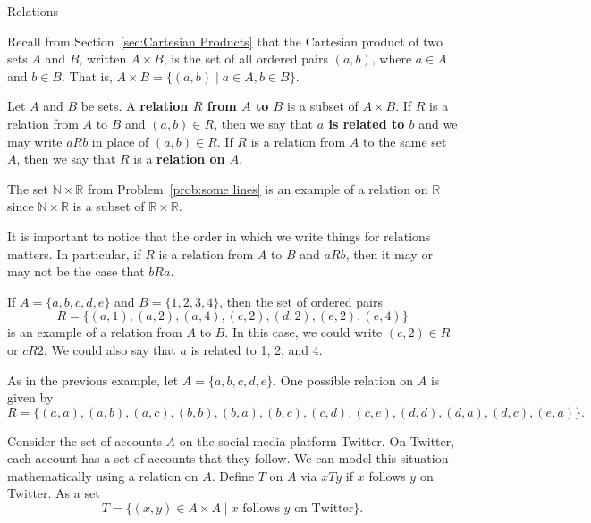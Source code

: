 \begin{section}{Relations}

Recall from Section~\ref{sec:Cartesian Products} that the Cartesian product of two sets $A$ and $B$, written $A\times B$, is the set of all ordered pairs $(a,b)$, where $a\in A$ and $b\in B$. That is, $A\times B=\{(a,b)\mid a\in A, b\in B\}$.

\begin{definition}
Let $A$ and $B$ be sets. A \textbf{relation $R$ from $A$ to $B$} is a subset of $A \times B$. If $R$ is a relation from $A$ to $B$ and $(a,b)\in {R}$, then we say that \textbf{$a$ is related to $b$} and we may write $\boxed{aR b}$ in place of $(a,b)\in{R}$. If $R$ is a relation from $A$ to the same set $A$, then we say that $R$ is a \textbf{relation on $A$}.
\end{definition}

\begin{example}
The set $\mathbb{N}\times \mathbb{R}$ from Problem~\ref{prob:some lines} is an example of a relation on $\mathbb{R}$ since $\mathbb{N}\times \mathbb{R}$ is a subset of $\mathbb{R}\times \mathbb{R}$.
\end{example}

It is important to notice that the order in which we write things for relations matters.  In particular, if $R$ is a relation from $A$ to $B$ and $a R b$, then it may or may not be the case that $bR a$.

\begin{example}\label{ex:relation finite to finite}
If $A=\{a,b,c,d,e\}$ and $B=\{1,2,3,4\}$, then the set of ordered pairs
\[
R=\{(a,1),(a,2),(a,4),(c,2),(d,2),(e,2),(e,4)\}
\]
is an example of a relation from $A$ to $B$. In this case, we could write $(c,2)\in{R}$ or $cR 2$. We could also say that $a$ is related to 1, 2, and 4. 
\end{example}

\begin{example}\label{ex:relation on finite}
As in the previous example, let $A=\{a,b,c,d,e\}$. One possible relation on $A$ is given by
\[
R=\{(a,a),(a,b),(a,c),(b,b),(b,a),(b,c),(c,d),(c,e),(d,d),(d,a),(d,c),(e,a)\}.
\]
\end{example}

\begin{example}\label{ex:Twitter}
Consider the set of accounts $A$ on the social media platform Twitter.  On Twitter, each account has a set of accounts that they follow.  We can model this situation mathematically using a relation on $A$.  Define $T$ on $A$ via $xTy$ if  $x$ follows $y$ on Twitter. As a set
\[
T=\{(x,y)\in A\times A\mid x\text{ follows }y\text{ on Twitter}\}.
\]
\end{example}


\end{section}
